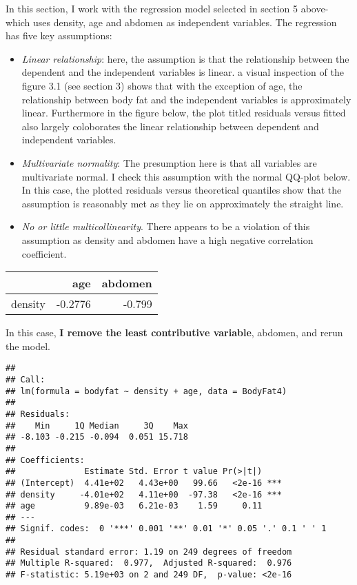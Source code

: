 \documentclass[
]{article}
\begin{document}
In this section, I work with the regression model selected in section 5
above- which uses density, age and abdomen as independent variables. The
regression has five key assumptions:

\begin{itemize}
\item
  \emph{Linear relationship}: here, the assumption is that the
  relationship between the dependent and the independent variables is
  linear. a visual inspection of the figure 3.1 (see section 3) shows
  that with the exception of age, the relationship between body fat and
  the independent variables is approximately linear. Furthermore in the
  figure below, the plot titled residuals versus fitted also largely
  coloborates the linear relationship between dependent and independent
  variables.
\item
  \emph{Multivariate normality}: The presumption here is that all
  variables are multivariate normal. I check this assumption with the
  normal QQ-plot below. In this case, the plotted residuals versus
  theoretical quantiles show that the assumption is reasonably met as
  they lie on approximately the straight line.
\item
  \emph{No or little multicollinearity}. There appears to be a violation
  of this assumption as density and abdomen have a high negative
  correlation coefficient.
\end{itemize}

\begin{tabular}{l|r|r}
\hline
  & age & abdomen\\
\hline
density & -0.2776 & -0.799\\
\hline
\end{tabular}

In this case, \textbf{I remove the least contributive variable},
abdomen, and rerun the model.

\begin{verbatim}
## 
## Call:
## lm(formula = bodyfat ~ density + age, data = BodyFat4)
## 
## Residuals:
##    Min     1Q Median     3Q    Max 
## -8.103 -0.215 -0.094  0.051 15.718 
## 
## Coefficients:
##              Estimate Std. Error t value Pr(>|t|)    
## (Intercept)  4.41e+02   4.43e+00   99.66   <2e-16 ***
## density     -4.01e+02   4.11e+00  -97.38   <2e-16 ***
## age          9.89e-03   6.21e-03    1.59     0.11    
## ---
## Signif. codes:  0 '***' 0.001 '**' 0.01 '*' 0.05 '.' 0.1 ' ' 1
## 
## Residual standard error: 1.19 on 249 degrees of freedom
## Multiple R-squared:  0.977,  Adjusted R-squared:  0.976 
## F-statistic: 5.19e+03 on 2 and 249 DF,  p-value: <2e-16
\end{verbatim}
\end{document}
